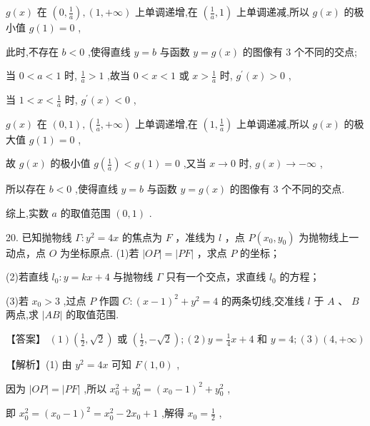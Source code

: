 \documentclass[10pt]{article}
\begin{document}
\(g\left( x\right)\) 在 \(\left( {0,\frac{1}{a}}\right) ,\left( {1, + \infty }\right)\) 上单调递增,在 \(\left( {\frac{1}{a},1}\right)\) 上单调递减,所以 \(g\left( x\right)\) 的极小值 \(g\left( 1\right)  = 0\) ,

此时,不存在 \(b < 0\) ,使得直线 \(y = b\) 与函数 \(y = g\left( x\right)\) 的图像有 3 个不同的交点;

当 \(0 < a < 1\) 时, \(\frac{1}{a} > 1\) ,故当 \(0 < x < 1\) 或 \(x > \frac{1}{a}\) 时, \({g}^{\prime }\left( x\right)  > 0\) ,

当 \(1 < x < \frac{1}{a}\) 时, \({g}^{\prime }\left( x\right)  < 0\) ,

\(g\left( x\right)\) 在 \(\left( {0,1}\right) ,\left( {\frac{1}{a}, + \infty }\right)\) 上单调递增,在 \(\left( {1,\frac{1}{a}}\right)\) 上单调递减,所以 \(g\left( x\right)\) 的极大值 \(g\left( 1\right)  = 0\) ,

故 \(g\left( x\right)\) 的极小值 \(g\left( \frac{1}{a}\right)  < g\left( 1\right)  = 0\) ,又当 \(x \rightarrow  0\) 时, \(g\left( x\right)  \rightarrow   - \infty\) ,

所以存在 \(b < 0\) ,使得直线 \(y = b\) 与函数 \(y = g\left( x\right)\) 的图像有 3 个不同的交点.

综上,实数 \(a\) 的取值范围 \(\left( {0,1}\right)\) .

20. 已知抛物线 \(\Gamma  : {y}^{2} = {4x}\) 的焦点为 \(F\) ，准线为 \(l\) ，点 \(P\left( {{x}_{0},{y}_{0}}\right)\) 为抛物线上一动点，点 \(O\) 为坐标原点. (1)若 \(\left| {OP}\right|  = \left| {PF}\right|\) ，求点 \(P\) 的坐标；

(2)若直线 \({l}_{0} : y = {kx} + 4\) 与抛物线 \(\Gamma\) 只有一个交点，求直线 \({l}_{0}\) 的方程；

(3)若 \({x}_{0} > 3\) ,过点 \(P\) 作圆 \(C : {\left( x - 1\right) }^{2} + {y}^{2} = 4\) 的两条切线,交准线 \(l\) 于 \(A\text{ 、 }B\) 两点,求 \(\left| {AB}\right|\) 的取值范围.

【答案】 \(\left( 1\right) \left( {\frac{1}{2},\sqrt{2}}\right)\) 或 \(\left( {\frac{1}{2}, - \sqrt{2}}\right) ;\left( 2\right) y = \frac{1}{4}x + 4\) 和 \(y = 4;\left( 3\right) \left( {4, + \infty }\right)\)

【解析】(1) 由 \({y}^{2} = {4x}\) 可知 \(F\left( {1,0}\right)\) ,

因为 \(\left| {OP}\right|  = \left| {PF}\right|\) ,所以 \({x}_{0}^{2} + {y}_{0}^{2} = {\left( {x}_{0} - 1\right) }^{2} + {y}_{0}^{2}\) ,

即 \({x}_{0}^{2} = {\left( {x}_{0} - 1\right) }^{2} = {x}_{0}^{2} - 2{x}_{0} + 1\) ,解得 \({x}_{0} = \frac{1}{2}\) ,
\end{document}
